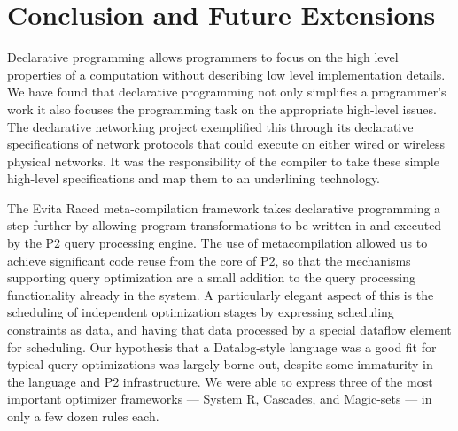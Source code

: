 \chapter[Conclusion and Future Extensions]{Conclusion and Future Extensions}
\label{ch:conclusion}


Declarative programming allows programmers to focus on the high level
properties of a computation without describing low level implementation
details.  We have found that declarative programming not only simplifies a
programmer's work it also focuses the programming task on the appropriate
high-level issues.  The declarative networking project exemplified this through
its declarative specifications of network protocols that could execute on
either wired or wireless physical networks.  It was the responsibility of the
compiler to take these simple high-level specifications and map them to an
underlining technology.

The Evita Raced meta-compilation framework takes declarative programming a step
further by allowing \OVERLOG program transformations to be written in \OVERLOG
and executed by the P2 query processing engine.  The use of metacompilation
allowed us to achieve significant code reuse from the core of P2, so that the
mechanisms supporting query optimization are a small addition to the query
processing functionality already in the system.  A particularly elegant aspect
of this is the scheduling of independent optimization stages by expressing
scheduling constraints as data, and having that data processed by a special
dataflow element for scheduling.  Our hypothesis that a Datalog-style language
was a good fit for typical query optimizations was largely borne out, despite
some immaturity in the \OVERLOG language and P2 infrastructure.  We were able
to express three of the most important optimizer frameworks --- System R,
Cascades, and Magic-sets --- in only a few dozen rules each.


